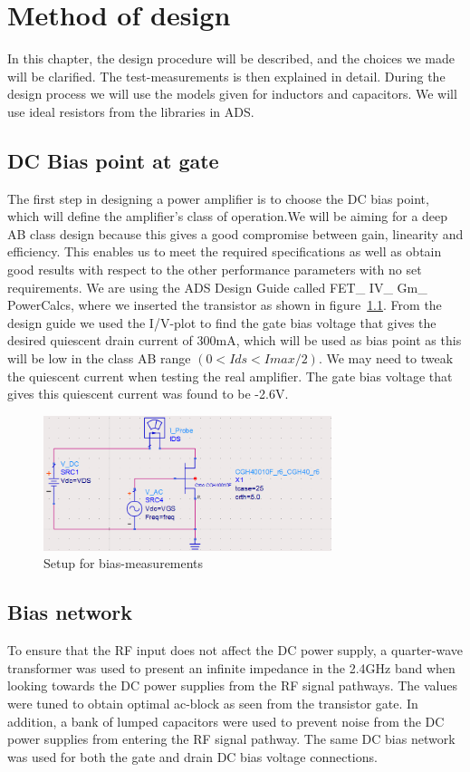 \chapter{Method of design}
  In this chapter, the design procedure will be described, and the choices we made will be clarified. The test-measurements is then explained in detail. During the design process we will use the models given for inductors and capacitors. We will use ideal resistors from the libraries in ADS.
  \section{DC Bias point at gate}
    The first step in designing a power amplifier is to choose the DC bias point, which will define the amplifier’s class of operation.We will be aiming for a deep AB class design because this gives a good compromise between gain, linearity and efficiency. This enables us to meet the required specifications as well as obtain good results with respect to the other performance parameters with no set requirements.
    We are using the ADS Design Guide called FET\_ IV\_ Gm\_ PowerCalcs, where we inserted the transistor as shown in figure~\ref{fig:fig_bias_sim}. From the design guide we used the I/V-plot to find the gate bias voltage that gives the desired quiescent drain current of 300mA, which will be used as bias point as this will be low in the class AB range $(0 < Ids < Imax/2)$. We may need to tweak the quiescent current when testing the real amplifier. The gate bias voltage that gives this quiescent current was found to be -2.6V.

  \begin{figure}[h]
	  \centering
	  \includegraphics[width=0.75\textwidth]{img/IV_simulation}
	  \caption{Setup for bias-measurements}
	  \label{fig:fig_bias_sim}
  \end{figure}

  \section{Bias network}
  To ensure that the RF input does not affect the DC power supply, a quarter-wave transformer was used to present an infinite impedance in the 2.4GHz band when looking towards the DC power supplies from the RF signal pathways. The values were tuned to obtain optimal ac-block as seen from the transistor gate. In addition, a bank of lumped capacitors were used to prevent noise from the DC power supplies from entering the RF signal pathway. The same DC bias network was used for both the gate and drain DC bias voltage connections.
  
